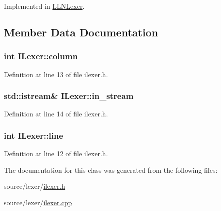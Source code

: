 Implemented in \hyperlink{class_l_l_n_lexer_a3832522afb32a85b3171f552ff9dd676}{L\-L\-N\-Lexer}.



\subsection{Member Data Documentation}
\hypertarget{class_i_lexer_a05ce2bfa3595f992618d2a328b66bdfb}{
\subsubsection[{column}]{\setlength{\rightskip}{0pt plus 5cm}int I\-Lexer\-::column\hspace{0.3cm}{\ttfamily [protected]}}}\label{class_i_lexer_a05ce2bfa3595f992618d2a328b66bdfb}


Definition at line 13 of file ilexer.\-h.

\hypertarget{class_i_lexer_a02d418cc6fdcbfbf6cad7bf914cce77f}{
\subsubsection[{in\-\_\-stream}]{\setlength{\rightskip}{0pt plus 5cm}std\-::istream\& I\-Lexer\-::in\-\_\-stream\hspace{0.3cm}{\ttfamily [protected]}}}\label{class_i_lexer_a02d418cc6fdcbfbf6cad7bf914cce77f}


Definition at line 14 of file ilexer.\-h.

\hypertarget{class_i_lexer_a5d766f4f4dcc976553ab17a5753ef8ff}{
\subsubsection[{line}]{\setlength{\rightskip}{0pt plus 5cm}int I\-Lexer\-::line\hspace{0.3cm}{\ttfamily [protected]}}}\label{class_i_lexer_a5d766f4f4dcc976553ab17a5753ef8ff}


Definition at line 12 of file ilexer.\-h.



The documentation for this class was generated from the following files\-:\begin{DoxyCompactItemize}
\item 
source/lexer/\hyperlink{ilexer_8h}{ilexer.\-h}\item 
source/lexer/\hyperlink{ilexer_8cpp}{ilexer.\-cpp}\end{DoxyCompactItemize}
